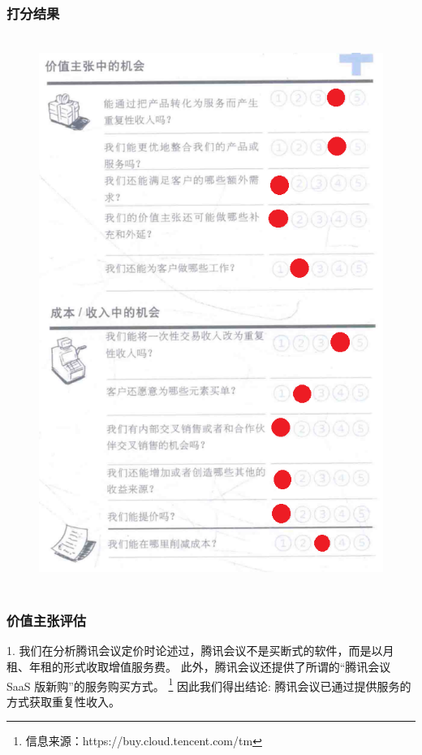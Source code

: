 \documentclass[a4paper,12pt]{article}
\begin{document}
    \subsubsection{打分结果}
    \begin{figure}[htbp]
        \centering
        \includegraphics[width=12cm,height=18cm]{png/评估机会}
    \end{figure}
    \clearpage %


    \subsubsection{价值主张评估}


    1.
    我们在分析腾讯会议定价时论述过，腾讯会议不是买断式的软件，而是以月租、年租的形式收取增值服务费。
    此外，腾讯会议还提供了所谓的“腾讯会议 SaaS 版新购”的服务购买方式。
    \footnote{信息来源：https://buy.cloud.tencent.com/tm}
    因此我们得出结论: 腾讯会议已通过提供服务的方式获取重复性收入。
\end{document}
